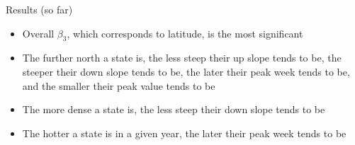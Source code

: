 \begin{block}{Results (so far)}
\begin{center}
\begin{figure}
		\end{figure}
	\begin{itemize}
		\item Overall $\beta_3$, which corresponds to latitude, is the most significant
		\item The further north a state is, the less steep their up slope tends to be, the steeper their down slope tends to be, the later their peak week tends to be, and the smaller their peak value tends to be
		\item The more dense a state is, the less steep their down slope tends to be
		\item The hotter a state is in a given year, the later their peak week tends to be
	\end{itemize}
	\end{center}

\end{block}

